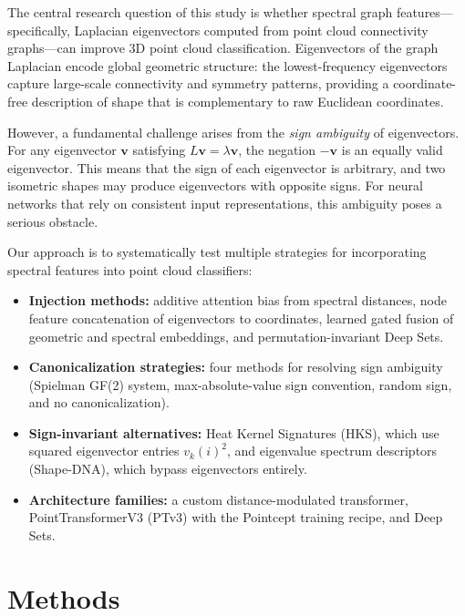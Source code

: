 \documentclass[11pt]{article}
\begin{document}
The central research question of this study is whether spectral graph features---specifically,
Laplacian eigenvectors computed from point cloud connectivity graphs---can improve 3D point
cloud classification. Eigenvectors of the graph Laplacian encode global geometric structure:
the lowest-frequency eigenvectors capture large-scale connectivity and symmetry patterns,
providing a coordinate-free description of shape that is complementary to raw Euclidean
coordinates.

However, a fundamental challenge arises from the \emph{sign ambiguity} of eigenvectors. For
any eigenvector $\mathbf{v}$ satisfying $L\mathbf{v} = \lambda\mathbf{v}$, the negation
$-\mathbf{v}$ is an equally valid eigenvector. This means that the sign of each eigenvector
is arbitrary, and two isometric shapes may produce eigenvectors with opposite signs. For
neural networks that rely on consistent input representations, this ambiguity poses a
serious obstacle.

Our approach is to systematically test multiple strategies for incorporating spectral
features into point cloud classifiers:
\begin{itemize}[nosep]
    \item \textbf{Injection methods:} additive attention bias from spectral distances, node
          feature concatenation of eigenvectors to coordinates, learned gated fusion of
          geometric and spectral embeddings, and permutation-invariant Deep Sets.
    \item \textbf{Canonicalization strategies:} four methods for resolving sign ambiguity
          (Spielman GF(2) system, max-absolute-value sign convention, random sign, and no
          canonicalization).
    \item \textbf{Sign-invariant alternatives:} Heat Kernel Signatures (HKS), which use
          squared eigenvector entries $v_k(i)^2$, and eigenvalue spectrum descriptors
          (Shape-DNA), which bypass eigenvectors entirely.
    \item \textbf{Architecture families:} a custom distance-modulated transformer,
          PointTransformerV3 (PTv3) with the Pointcept training recipe, and Deep Sets.
\end{itemize}

\section{Methods}
\end{document}

